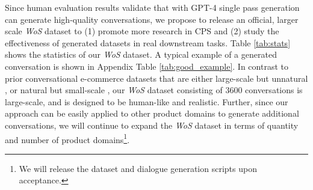 Since human evaluation results validate that \method with GPT-4 single pass generation can generate high-quality conversations, we propose to release an official, larger scale \textit{WoS} dataset to (1) promote more research in CPS and (2) study the effectiveness of generated datasets in real downstream tasks. Table \ref{tab:stats} shows the statistics of our \textit{WoS} dataset.
A typical example of a generated conversation is shown in Appendix Table \ref{tab:good_example}. %
In contrast to prior conversational e-commerce datasets that are either large-scale but unnatural \cite{zou2022learning}, or natural but small-scale \cite{Bernard:2023:SIGIR}, our \textit{WoS} dataset consisting of 3600 conversations is large-scale, and is designed to be human-like and realistic. Further, since our \method approach can be easily applied to other product domains to generate additional conversations, we will continue to expand the \textit{WoS} dataset in terms of quantity and number of product domains\footnote{We will release the dataset and dialogue generation scripts upon acceptance.}.

